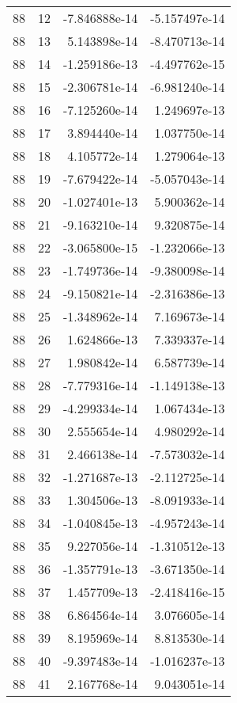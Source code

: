 \begin{tabular}{rrrr}
  88 &   12 & -7.846888e-14 & -5.157497e-14 \\
  88 &   13 &  5.143898e-14 & -8.470713e-14 \\
  88 &   14 & -1.259186e-13 & -4.497762e-15 \\
  88 &   15 & -2.306781e-14 & -6.981240e-14 \\
  88 &   16 & -7.125260e-14 &  1.249697e-13 \\
  88 &   17 &  3.894440e-14 &  1.037750e-14 \\
  88 &   18 &  4.105772e-14 &  1.279064e-13 \\
  88 &   19 & -7.679422e-14 & -5.057043e-14 \\
  88 &   20 & -1.027401e-13 &  5.900362e-14 \\
  88 &   21 & -9.163210e-14 &  9.320875e-14 \\
  88 &   22 & -3.065800e-15 & -1.232066e-13 \\
  88 &   23 & -1.749736e-14 & -9.380098e-14 \\
  88 &   24 & -9.150821e-14 & -2.316386e-13 \\
  88 &   25 & -1.348962e-14 &  7.169673e-14 \\
  88 &   26 &  1.624866e-13 &  7.339337e-14 \\
  88 &   27 &  1.980842e-14 &  6.587739e-14 \\
  88 &   28 & -7.779316e-14 & -1.149138e-13 \\
  88 &   29 & -4.299334e-14 &  1.067434e-13 \\
  88 &   30 &  2.555654e-14 &  4.980292e-14 \\
  88 &   31 &  2.466138e-14 & -7.573032e-14 \\
  88 &   32 & -1.271687e-13 & -2.112725e-14 \\
  88 &   33 &  1.304506e-13 & -8.091933e-14 \\
  88 &   34 & -1.040845e-13 & -4.957243e-14 \\
  88 &   35 &  9.227056e-14 & -1.310512e-13 \\
  88 &   36 & -1.357791e-13 & -3.671350e-14 \\
  88 &   37 &  1.457709e-13 & -2.418416e-15 \\
  88 &   38 &  6.864564e-14 &  3.076605e-14 \\
  88 &   39 &  8.195969e-14 &  8.813530e-14 \\
  88 &   40 & -9.397483e-14 & -1.016237e-13 \\
  88 &   41 &  2.167768e-14 &  9.043051e-14 \\

\end{tabular}
